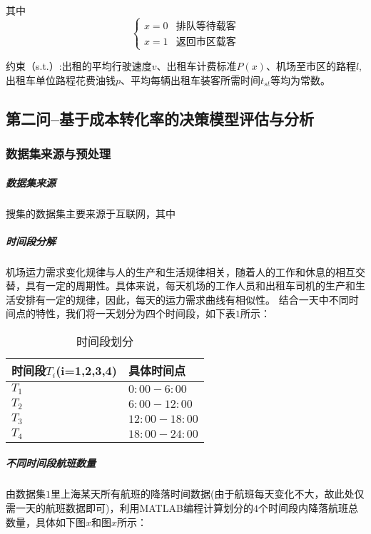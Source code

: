 \documentclass[withoutpreface,bwprint]{cumcmthesis} %
\begin{document}
其中
\begin{equation}
\begin{cases}
x=0  &  \mbox{排队等待载客}  \\
x=1  &   \mbox{返回市区载客}
\end{cases}
\end{equation}


约束（s.t.）:出租的平均行驶速度$v$、出租车计费标准$P(x)$、机场至市区的路程$l$,出租车单位路程花费油钱$p$、平均每辆出租车装客所需时间$t_{st}$等均为常数。

\subsection{第二问--基于成本转化率的决策模型评估与分析}
\subsubsection{数据集来源与预处理}


\subparagraph{数据集来源}
搜集的数据集主要来源于互联网，其中



\subparagraph{时间段分解}机场运力需求变化规律与人的生产和生活规律相关，随着人的工作和休息的相互交替，具有一定的周期性。具体来说，每天机场的工作人员和出租车司机的生产和生活安排有一定的规律，因此，每天的运力需求曲线有相似性\cite{bib:four}。
结合一天中不同时间点的特性，我们将一天划分为四个时间段，如下表$1$所示：
\begin{table}[htbp] 
\caption{时间段划分}  
	\centering
	\begin{tabular}{p{7.5cm}<{\centering} p{7.5cm}<{\centering}} 
		\toprule[1.5pt]
		时间段$T_i$(i=1,2,3,4) & 具体时间点\\ 
		\midrule 

	$T_1$		& $0:00-6:00$  \\
	$T_2$		& $6:00-12:00$  \\
	$T_3$		& $12:00-18:00$  \\
	$T_4$		&  $18:00-24:00$  \\	
  	

		\bottomrule[1.5pt] 
	\end{tabular} 

\end{table}

\subparagraph{不同时间段航班数量}由数据集$1$里上海某天所有航班的降落时间数据(由于航班每天变化不大，故此处仅需一天的航班数据即可)，利用MATLAB编程计算划分的$4$个时间段内降落航班总数量，具体如下图$x$和图$x$所示：
\end{document}
